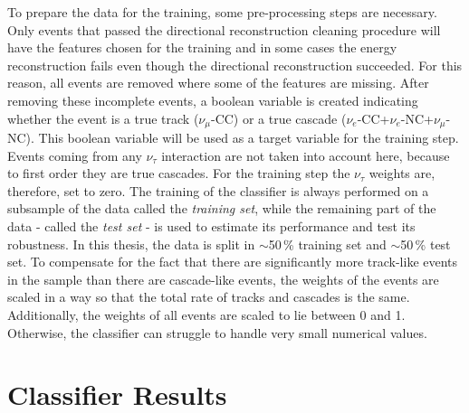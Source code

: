 To prepare the data for the training, some pre-processing steps are necessary.
Only events that passed the directional reconstruction cleaning procedure will have the features chosen for the training and in some cases the energy reconstruction fails even though the directional reconstruction succeeded.
For this reason, all events are removed where some of the features are missing.
After removing these incomplete events, a boolean variable is created indicating whether the event is a true track ($\nu_\mu$-CC) or a true cascade ($\nu_e$-CC+$\nu_e$-NC+$\nu_\mu$-NC).
This boolean variable will be used as a target variable for the training step.
Events coming from any $\nu_\tau$ interaction are not taken into account here, because to first order they are true cascades.
For the training step the $\nu_\tau$ weights are, therefore, set to zero.
The training of the classifier is always performed on a subsample of the data called the \textit{training set}, while the remaining part of the data - called the \textit{test set} - is used to estimate its performance and test its robustness. 
In this thesis, the data is split in $\sim$50\,\% training set and $\sim$50\,\% test set.
To compensate for the fact that there are significantly more track-like events in the sample than there are cascade-like events, the weights of the events are scaled in a way so that the total rate of tracks and cascades is the same.
Additionally, the weights of all events are scaled to lie between 0 and 1.
Otherwise, the classifier can struggle to handle very small numerical values.


\section{Classifier Results} \label{sec:classifier_results}

